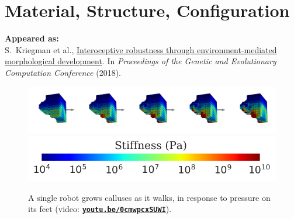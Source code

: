 

\chapter{Material, Structure, Configuration}

\textbf{Appeared as:}\\
S.~Kriegman et al., 
\href{https://arxiv.org/abs/1804.02257}{\color{blue}Interoceptive robustness through environment-mediated morphological development}. In
\textit{Proceedings of the Genetic and Evolutionary Computation Conference} (2018).



\begin{figure}[!h]
    \centering
    \includegraphics[width=\linewidth]{Chapter06/img/Callosities} \\
    \vspace{-0.5em}
    \includegraphics[width=0.35\linewidth]{Chapter06/img/colorbar} \\
    \caption{A single robot grows calluses as it walks, 
    in response to pressure on its feet   
    (video: \href{https://youtu.be/0cmwpcxSUWI}{\color{blue}\textbf{\texttt{youtu.be/0cmwpcxSUWI}}}).
    } %
    \label{fig6:calluses}
\end{figure}

